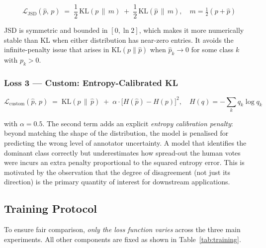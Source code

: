 \documentclass[11pt,a4paper]{article}
\newcommand{\KL}{\mathrm{KL}}
\newcommand{\JSD}{\mathrm{JSD}}
\begin{document}
\begin{equation}
  \mathcal{L}_{\JSD}(\hat{p},\, p) \;=\;
  \frac{1}{2}\,\KL\!\left(p \,\Big\|\, m\right) \;+\;
  \frac{1}{2}\,\KL\!\left(\hat{p} \,\Big\|\, m\right),
  \quad m = \tfrac{1}{2}(p + \hat{p})
  \label{eq:jsd}
\end{equation}

JSD is symmetric and bounded in $[0, \ln 2]$, which makes it more numerically
stable than KL when either distribution has near-zero entries.
It avoids the infinite-penalty issue that arises in $\KL(p\|\hat{p})$ when
$\hat{p}_k \to 0$ for some class $k$ with $p_k > 0$.

\subsubsection{Loss 3 — Custom: Entropy-Calibrated KL}

\begin{equation}
  \mathcal{L}_{\mathrm{custom}}(\hat{p},\, p)
  \;=\;
  \KL(p \,\|\, \hat{p})
  \;+\;
  \alpha \cdot \bigl[H(\hat{p}) - H(p)\bigr]^2,
  \quad H(q) = -\textstyle\sum_k q_k \log q_k
  \label{eq:custom}
\end{equation}

with $\alpha = 0.5$.
The second term adds an explicit \emph{entropy calibration penalty}: beyond
matching the shape of the distribution, the model is penalised for predicting
the wrong level of annotator uncertainty.
A model that identifies the dominant class correctly but underestimates how
spread-out the human votes were incurs an extra penalty proportional to the
squared entropy error.
This is motivated by the observation that the degree of disagreement (not just
its direction) is the primary quantity of interest for downstream applications.

\subsection{Training Protocol}

To ensure fair comparison, \emph{only the loss function varies} across the
three main experiments.
All other components are fixed as shown in Table~\ref{tab:training}.
\end{document}
